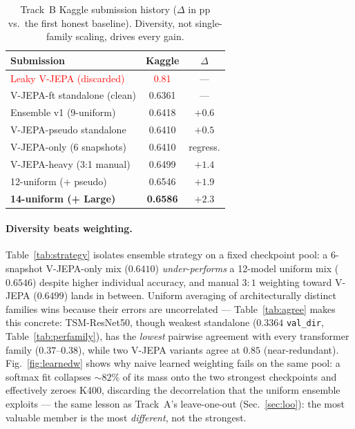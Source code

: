 \documentclass[10pt,twocolumn,letterpaper]{article}
\begin{document}
\begin{table}[t]
\centering\small
\setlength{\tabcolsep}{5pt}
\begin{tabular}{@{}lcc@{}}
\toprule
Submission & Kaggle & $\Delta$ \\
\midrule
\textcolor{red}{Leaky V-JEPA (discarded)} & \textcolor{red}{0.81} & --- \\
V-JEPA-ft standalone (clean)   & 0.6361 & --- \\
Ensemble v1 (9-uniform)        & 0.6418 & $+0.6$ \\
V-JEPA-pseudo standalone       & 0.6410 & $+0.5$ \\
V-JEPA-only (6 snapshots)      & 0.6410 & regress. \\
V-JEPA-heavy (3:1 manual)      & 0.6499 & $+1.4$ \\
12-uniform (+ pseudo)          & 0.6546 & $+1.9$ \\
\textbf{14-uniform (+ Large)}  & \textbf{0.6586} & $+2.3$ \\
\bottomrule
\end{tabular}
\caption{Track~B Kaggle submission history ($\Delta$ in pp vs.\ the first honest
baseline). Diversity, not single-family scaling, drives every gain.}
\label{tab:kaggle}
\end{table}

\paragraph{Diversity beats weighting.}
Table~\ref{tab:strategy} isolates ensemble strategy on a fixed checkpoint
pool: a 6-snapshot V-JEPA-only mix ($0.6410$) \emph{under-performs} a
12-model uniform mix ($0.6546$) despite higher individual accuracy, and
manual $3{:}1$ weighting toward V-JEPA ($0.6499$) lands in between. Uniform
averaging of architecturally distinct families wins because their errors are
uncorrelated --- Table~\ref{tab:agree} makes this concrete: TSM-ResNet50,
though weakest standalone ($0.3364$ \texttt{val\_dir}, Table~\ref{tab:perfamily}),
has the \emph{lowest} pairwise agreement with every transformer family
($0.37$--$0.38$), while two V-JEPA variants agree at $0.85$ (near-redundant).
Fig.~\ref{fig:learnedw} shows why naive learned weighting fails on the same
pool: a softmax fit collapses ${\sim}82\%$ of its mass onto the two strongest
checkpoints and effectively zeroes K400, discarding the decorrelation that
the uniform ensemble exploits --- the same lesson as Track~A's
leave-one-out (Sec.~\ref{sec:loo}): the most valuable member is the most
\emph{different}, not the strongest.
\end{document}
